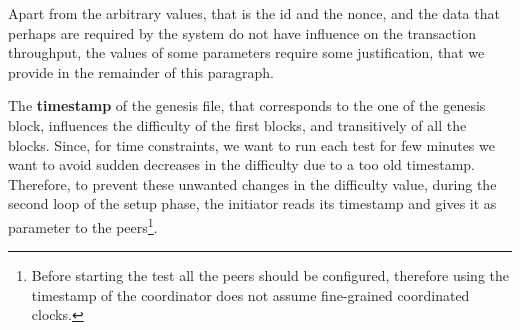 \begin{figure}[H]
    
\end{figure}


Apart from the arbitrary values, that is the id and the nonce, and the data
that perhaps are required by the system do not have influence on the transaction
throughput, the values of some parameters require some justification, that we
provide in the remainder of this paragraph.

The \textbf{timestamp} of the genesis file, that corresponds to the one of the
genesis block, influences the difficulty of the first blocks, and transitively
of all the blocks. Since, for time constraints, we want to run each test for few
minutes we want to avoid sudden decreases in the difficulty due to a too old
timestamp. Therefore, to prevent these unwanted changes in the difficulty value,
during the second loop of the setup phase, the initiator reads its timestamp and
gives it as parameter to the peers\footnote{Before starting the test all the
peers should be configured, therefore using the timestamp of the coordinator
does not assume fine-grained coordinated clocks.}.

